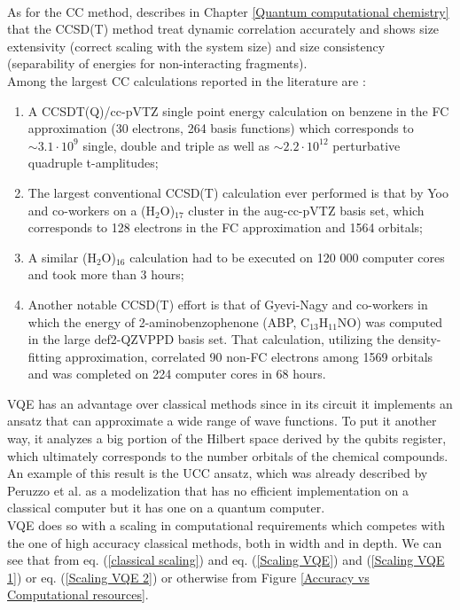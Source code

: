 \\
As for the CC method, describes in Chapter \ref{Quantum computational chemistry} that the CCSD(T) method treat dynamic correlation accurately and shows size extensivity (correct scaling with the system size) and size consistency (separability of energies for non-interacting fragments). \\
Among the largest CC calculations reported in the literature are \cite{Elfving2020Sep}:
\begin{enumerate}
    \item A CCSDT(Q)/cc-pVTZ single point energy calculation on benzene in the FC approximation (30 electrons, 264 basis functions) which corresponds to $\sim 3.1 \cdot 10^9$ single, double and triple as well as $\sim 2.2 \cdot 10^{12}$ perturbative quadruple t-amplitudes;
    
    \item The largest conventional CCSD(T) calculation ever performed is that by Yoo and co-workers on a (H$_2$O)$_{17}$ cluster in the aug-cc-pVTZ basis set, which corresponds to 128 electrons in the FC approximation and 1564 orbitals;
    
    \item A similar (H$_2$O)$_{16}$ calculation had to be executed on 120 000 computer cores and took more than 3 hours;
    
    \item Another notable CCSD(T) effort is that of Gyevi-Nagy and co-workers in which the energy of 2-aminobenzophenone (ABP, C$_{13}$H$_{11}$NO) was computed in the large def2-QZVPPD basis set. That calculation, utilizing the density-fitting approximation, correlated 90 non-FC electrons among 1569 orbitals and was completed on 224 computer cores in 68 hours.
\end{enumerate}
VQE has an advantage over classical methods since in its circuit it implements an ansatz that can approximate a wide range of wave functions. To put it another way, it analyzes a big portion of the Hilbert space derived by the qubits register, which ultimately corresponds to the number orbitals of the chemical compounds. An example of this result is the UCC ansatz, which was already described by Peruzzo et al. \cite{Peruzzo2014Jul} as a modelization that has no efficient implementation on a classical computer but it has one on a quantum computer. \\
VQE does so with a scaling in computational requirements which competes with the one of high accuracy classical methods, both in width and in depth. We can see that from eq. (\ref{classical scaling}) and eq. (\ref{Scaling VQE}) and (\ref{Scaling VQE 1}) or eq. (\ref{Scaling VQE 2}) or otherwise from Figure \ref{Accuracy vs Computational resources}. \\
